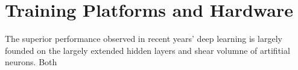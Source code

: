 \section{Training Platforms and Hardware}
The superior performance observed in recent years' deep learning is largely founded on the largely extended hidden layers and shear volumne of artifitial neurons. Both 
